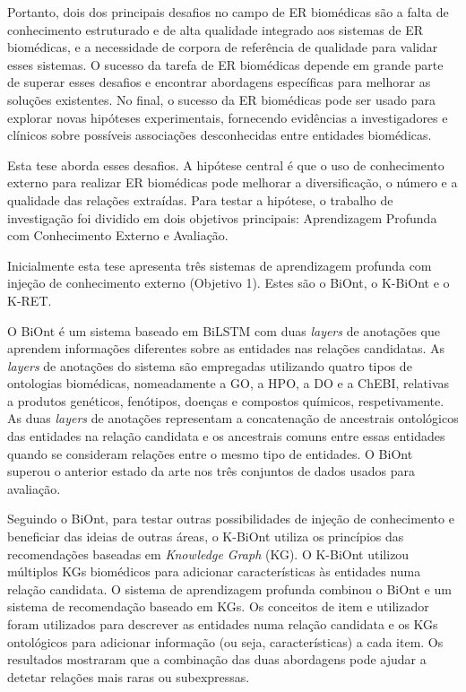 Portanto, dois dos principais desafios no campo de ER biomédicas são a falta de conhecimento estruturado e de alta qualidade integrado aos sistemas de ER biomédicas, e a necessidade de corpora de referência de qualidade para validar esses sistemas. O sucesso da tarefa de ER biomédicas depende em grande parte de superar esses desafios e encontrar abordagens específicas para melhorar as soluções existentes. No final, o sucesso da ER biomédicas pode ser usado para explorar novas hipóteses experimentais, fornecendo evidências a investigadores e clínicos sobre possíveis associações desconhecidas entre entidades biomédicas.

Esta tese aborda esses desafios. A hipótese central é que o uso de conhecimento externo para realizar ER biomédicas pode melhorar a diversificação, o número e a qualidade das relações extraídas. Para testar a hipótese, o trabalho de investigação foi dividido em dois objetivos principais: Aprendizagem Profunda com Conhecimento Externo e Avaliação.

Inicialmente esta tese apresenta três sistemas de aprendizagem profunda com injeção de conhecimento externo (Objetivo 1). Estes são o BiOnt, o K-BiOnt e o K-RET.

O BiOnt é um sistema baseado em BiLSTM com duas \textit{layers} de anotações que aprendem informações diferentes sobre as entidades nas relações candidatas. As \textit{layers} de anotações do sistema são empregadas utilizando quatro tipos de ontologias biomédicas, nomeadamente a GO, a HPO, a DO e a ChEBI, relativas a produtos genéticos, fenótipos, doenças e compostos químicos, respetivamente. As duas \textit{layers} de anotações representam a concatenação de ancestrais ontológicos das entidades na relação candidata e os ancestrais comuns entre essas entidades quando se consideram relações entre o mesmo tipo de entidades. O BiOnt superou o anterior estado da arte nos três conjuntos de dados usados para avaliação.

Seguindo o BiOnt, para testar outras possibilidades de injeção de conhecimento e beneficiar das ideias de outras áreas, o K-BiOnt utiliza os princípios das recomendações baseadas em \textit{Knowledge Graph} (KG). O K-BiOnt utilizou múltiplos KGs biomédicos para adicionar características às entidades numa relação candidata. O sistema de aprendizagem profunda combinou o BiOnt e um sistema de recomendação baseado em KGs. Os conceitos de item e utilizador foram utilizados para descrever as entidades numa relação candidata e os KGs ontológicos para adicionar informação (ou seja, características) a cada item. Os resultados mostraram que a combinação das duas abordagens pode ajudar a detetar relações mais raras ou subexpressas.

